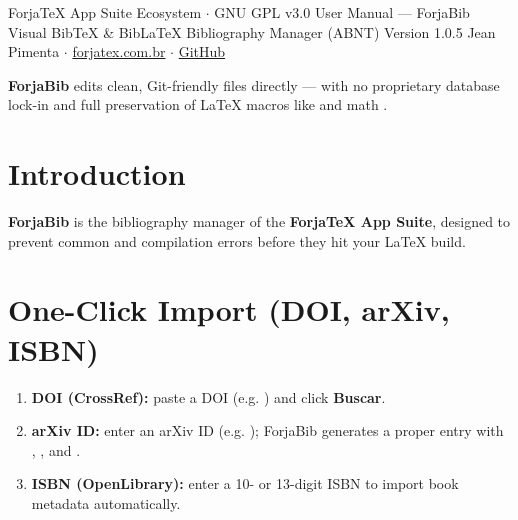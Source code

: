 \documentclass[11pt,a4paper]{article}
\begin{document}
  {ForjaTeX App Suite Ecosystem $\cdot$ GNU GPL v3.0}
  {User Manual --- ForjaBib}
  {Visual BibTeX \& BibLaTeX Bibliography Manager (ABNT)}
  {Version 1.0.5}
  {Jean Pimenta $\cdot$ \href{https://forjatex.com.br}{\color{fjsky}forjatex.com.br} $\cdot$ \href{https://github.com/jeanjpimenta/forjatex-suite}{\color{fjsky}GitHub}}


\begin{fjcallout}
\textbf{ForjaBib} edits clean, Git-friendly  files directly --- with no proprietary database lock-in and full preservation of \LaTeX{} macros like  and math .
\end{fjcallout}

\section{Introduction}
\textbf{ForjaBib} is the bibliography manager of the \textbf{ForjaTeX App Suite}, designed to prevent common  and  compilation errors before they hit your \LaTeX{} build.

\section{One-Click Import (DOI, arXiv, ISBN)}
\begin{enumerate}
  \item \textbf{DOI (CrossRef):} paste a DOI (e.g. ) and click \textbf{Buscar}.
  \item \textbf{arXiv ID:} enter an arXiv ID (e.g. ); ForjaBib generates a proper  entry with , , and .
  \item \textbf{ISBN (OpenLibrary):} enter a 10- or 13-digit ISBN to import book metadata automatically.
\end{enumerate}
\end{document}
